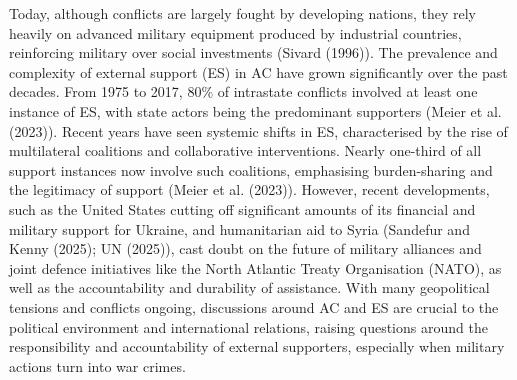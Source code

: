 \documentclass[
]{article}
\begin{document}
Today, although conflicts are largely fought by developing nations, they
rely heavily on advanced military equipment produced by industrial
countries, reinforcing military over social investments (Sivard (1996)).
The prevalence and complexity of external support (ES) in AC have grown
significantly over the past decades. From 1975 to 2017, 80\% of
intrastate conflicts involved at least one instance of ES, with state
actors being the predominant supporters (Meier et al. (2023)). Recent
years have seen systemic shifts in ES, characterised by the rise of
multilateral coalitions and collaborative interventions. Nearly
one-third of all support instances now involve such coalitions,
emphasising burden-sharing and the legitimacy of support (Meier et al.
(2023)). However, recent developments, such as the United States cutting
off significant amounts of its financial and military support for
Ukraine, and humanitarian aid to Syria (Sandefur and Kenny (2025); UN
(2025)), cast doubt on the future of military alliances and joint
defence initiatives like the North Atlantic Treaty Organisation (NATO),
as well as the accountability and durability of assistance. With many
geopolitical tensions and conflicts ongoing, discussions around AC and
ES are crucial to the political environment and international relations,
raising questions around the responsibility and accountability of
external supporters, especially when military actions turn into war
crimes.
\end{document}
